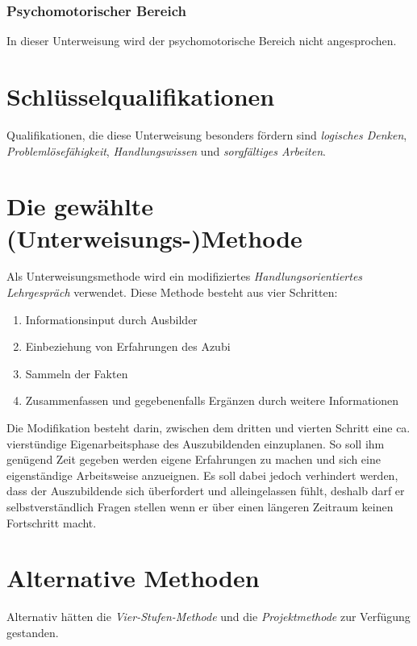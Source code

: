 \documentclass[11pt,a4paper,notitlepage,ngerman]{article}
\begin{document}
\subsubsection{Psychomotorischer Bereich}

In dieser Unterweisung wird der psychomotorische Bereich nicht angesprochen.

\section{Schlüsselqualifikationen}

Qualifikationen, die diese Unterweisung besonders fördern sind \emph{logisches Denken},
\emph{Problemlösefähigkeit}, \emph{Handlungswissen} und \emph{sorgfältiges Arbeiten}.

\section{Die gewählte (Unterweisungs-)Methode}

Als Unterweisungsmethode wird ein modifiziertes \emph{Handlungsorientiertes Lehrgespräch}
verwendet. Diese Methode besteht aus vier Schritten:

\begin{enumerate}
  \item{Informationsinput durch Ausbilder}
  \item{Einbeziehung von Erfahrungen des Azubi}
  \item{Sammeln der Fakten}
  \item{Zusammenfassen und gegebenenfalls Ergänzen durch weitere Informationen}  
\end{enumerate}

Die Modifikation besteht darin, zwischen dem dritten und vierten Schritt
eine ca. vierstündige Eigenarbeitsphase des Auszubildenden einzuplanen. So soll
ihm genügend Zeit gegeben werden eigene Erfahrungen zu machen und sich eine
eigenständige Arbeitsweise anzueignen. Es soll dabei jedoch verhindert werden,
dass der Auszubildende sich überfordert und alleingelassen fühlt, deshalb
darf er selbstverständlich Fragen stellen wenn er über einen längeren Zeitraum
keinen Fortschritt macht.

\section{Alternative Methoden}

Alternativ hätten die \emph{Vier-Stufen-Methode} und die \emph{Projektmethode}
zur Verfügung gestanden.
\end{document}
